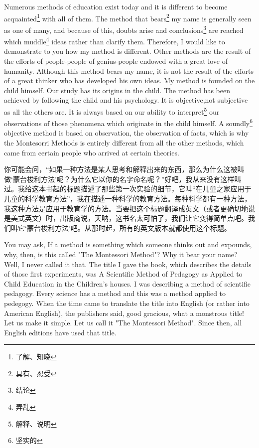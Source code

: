 \documentclass[lang=cn,10pt]{elegantbook}
\begin{document}
Numerous methods of education exist today and it is different to become acquainted\footnote{了解、知晓} with all of them. The method that bears\footnote{具有、忍受} my name is generally seen as one of many, and because of this, doubts arise and conclusions\footnote{结论} are reached which muddle\footnote{弄乱} ideas rather than clarify them. Therefore, I would like to demonstrate to you how my method is different. Other methods are the result of the efforts of people-people of genius-people endowed with a great love of humanity. Although this method bears my name, it is not the result of the efforts of a great thinker who has developed his own ideas. My method is founded on the child himself. Our study has its origins in the child. The method has been achieved by following the child and his psychology. It is objective,not subjective as all the others are. It is always based on our ability to interpret\footnote{解释、说明} our observations of those phenomena which originate in the child himself. A soundly\footnote{坚实的} objective method is based on observation, the observation of facts, which is why the Montesorri Methods is entirely different from all the other methods, which came from certain people who arrived at certain theories.

你可能会问，“如果一种方法是某人思考和解释出来的东西，那么为什么这被叫做‘蒙台梭利方法’呢？为什么它以你的名字命名呢？”好吧，我从来没有这样叫过。我给这本书起的标题描述了那些第一次实验的细节，它叫“在儿童之家应用于儿童的科学教育方法”，我在描述一种科学的教育方法。每种科学都有一种方法，我这种方法是应用于教育学的方法。当要把这个标题翻译成英文（或者更确切地说是美式英文）时，出版商说，天呐，这书名太可怕了，我们让它变得简单点吧。我们叫它‘蒙台梭利方法’吧。从那时起，所有的英文版本就都使用这个标题。

You may ask, If a method is something which someone thinks out and expounds, why, then, is this called "The Montessori Method"? Why it bear your name? Well, I never called it that. The title I gave the book, which describes the details of those first experiments, was A Scientific Method of Pedagogy as Applied to Child Education in the Children's houses. I was describing a method of scientific pedagogy. Every science has a method and this was a method applied to pedegogy. When the time came to translate the title into English (or rather into American English), the publishers said, good gracious, what a monstrous title! Let us make it simple. Let us call it "The Montessori Method". Since then, all English editions have used that title.
\end{document}
